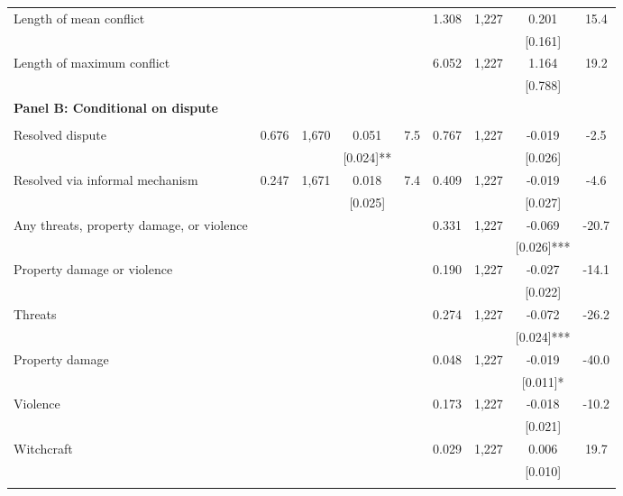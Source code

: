 \begin{tabular}{lcccccccc}
\quad Length of mean conflict \phantom{} &  &  &  &  & 1.308 & 1,227 & 0.201 & 15.4\\
 &  &  &  &  &  &  & [0.161] & \\
Length of maximum conflict \phantom{} &  &  &  &  & 6.052 & 1,227 & 1.164 & 19.2\\
 &  &  &  &  &  &  & [0.788] & \\
\textbf{Panel B: Conditional on dispute} &  &  &  &  &  &  &  & \\
 &  &  &  &  &  &  &  & \\
Resolved dispute & 0.676 & 1,670 & 0.051 & 7.5 & 0.767 & 1,227 & -0.019 & -2.5\\
 &  &  & [0.024]** &  &  &  & [0.026] & \\
\quad Resolved via informal mechanism & 0.247 & 1,671 & 0.018 & 7.4 & 0.409 & 1,227 & -0.019 & -4.6\\
 &  &  & [0.025] &  &  &  & [0.027] & \\
\phantom{} Any threats, property damage, or violence \phantom{} &  &  &  &  & 0.331 & 1,227 & -0.069 & -20.7\\
 &  &  &  &  &  &  & [0.026]*** & \\
\quad Property damage or violence \phantom{} &  &  &  &  & 0.190 & 1,227 & -0.027 & -14.1\\
 &  &  &  &  &  &  & [0.022] & \\
\quad Threats \phantom{} &  &  &  &  & 0.274 & 1,227 & -0.072 & -26.2\\
 &  &  &  &  &  &  & [0.024]*** & \\
\quad Property damage \phantom{} &  &  &  &  & 0.048 & 1,227 & -0.019 & -40.0\\
 &  &  &  &  &  &  & [0.011]* & \\
\quad Violence \phantom{} &  &  &  &  & 0.173 & 1,227 & -0.018 & -10.2\\
 &  &  &  &  &  &  & [0.021] & \\
\quad Witchcraft \phantom{} &  &  &  &  & 0.029 & 1,227 & 0.006 & 19.7\\
 &  &  &  &  &  &  & [0.010] & \\
\noalign{\smallskip}\hline\end{tabular}
